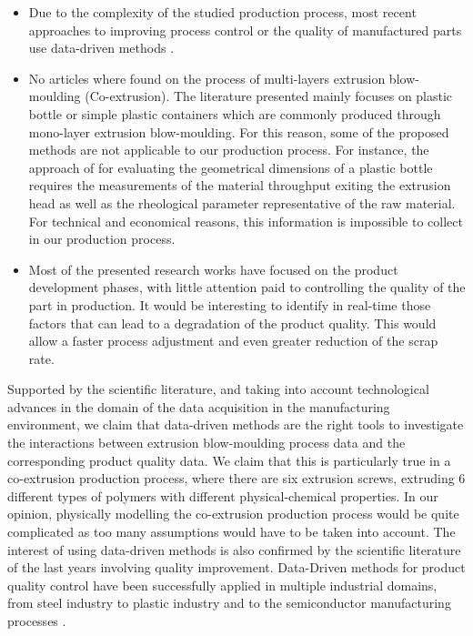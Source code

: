 \begin{itemize}
    \item Due to the complexity of the studied production process, most recent approaches to improving process control or the quality of manufactured parts use data-driven methods \citep{diraddo1993line, diraddo1993modeling, ramana2013data}.
    \item No articles where found on the process of multi-layers extrusion blow-moulding (Co-extrusion). The literature presented mainly focuses on plastic bottle or simple plastic containers which are commonly produced through mono-layer extrusion blow-moulding. For this reason, some of the proposed methods are not applicable to our production process. For instance, the approach of \citet{diraddo1993line} for evaluating the geometrical dimensions of a plastic bottle requires the measurements of the material throughput exiting the extrusion head as well as the rheological parameter representative of the raw material. For technical and economical reasons, this information is impossible to collect in our production process.
    \item Most of the presented research works have focused on the product development phases, with little attention paid to controlling the quality of the part in production. It would be interesting to identify in real-time those factors that can lead to a degradation of the product quality. This would allow a faster process adjustment and even greater reduction of the scrap rate.

\end{itemize}

Supported by the scientific literature, and taking into account technological advances in the domain of the data acquisition in the manufacturing environment, we claim that data-driven methods are the right tools to investigate the interactions between extrusion blow-moulding process data and the corresponding product quality data. We claim that this is particularly true in a co-extrusion production process, where there are six extrusion screws, extruding 6 different types of polymers with different physical-chemical properties. In our opinion, physically modelling the co-extrusion production process would be quite complicated as too many assumptions would have to be taken into account. The interest of using data-driven methods is also confirmed by the scientific literature of the last years involving quality improvement. Data-Driven methods for product quality control have been successfully applied in multiple industrial domains, from steel industry \citep{lieber2013quality,li2018ensemble} to plastic industry \citep{chen2008neural,nagorny2017quality,nagorny2018generative,haeussler1996quality,tellaeche2013machine,sharma2017taguchi} and to the semiconductor manufacturing processes \citep{melhem2016regression,lenz2013data,jiang2020novel}.

